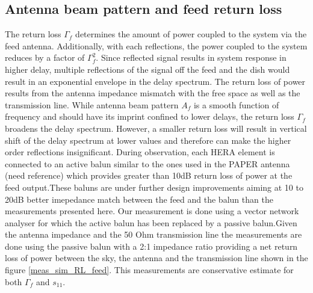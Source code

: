 \documentclass[twocolumn]{emulateapj}
\begin{document}
\subsection{\textbf{Antenna beam pattern and feed return loss}}
The return loss $\Gamma_{f}$ determines the amount of power coupled to the system via the feed antenna. Additionally, with each reflections, the power coupled to the system reduces by a factor of $\Gamma_{f}^{2}$. Since reflected signal results in system response in higher delay, multiple reflections of the signal off the feed and the dish would result in an exponential envelope in the delay spectrum.  The return loss of power results from the antenna impedance mismatch with the free space as well as the transmission line. While antenna beam pattern $A_{f}$ is a smooth function of frequency and should have its imprint confined to lower delays, the return loss $\Gamma_{f}$ broadens the delay spectrum. However, a smaller return loss will result in vertical shift of the delay spectrum at lower values and therefore can make the higher order reflections insignificant. During observation, each HERA element is connected to an active balun similar to the ones used in the PAPER antenna (need reference) which provides greater than 10dB return loss of power at the feed output.These baluns are under further design improvements aiming at 10 to 20dB better imepedance match between the feed and the balun than the measurements presented here.  Our measurement is done using a vector network analyser for which the active balun has been replaced by a passive balun.Given the antenna impedance and the 50 Ohm transmission line the measurements are done using the passive balun with a 2:1 impedance ratio providing a net return loss of power between the sky, the antenna and the transmission line shown in the figure \ref{meas_sim_RL_feed}. This measurements are conservative estimate  for both $\Gamma_{f}$ and $s_{11}$.
\end{document}
